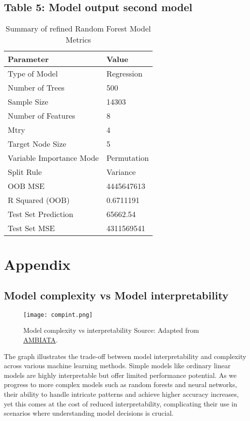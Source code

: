 \documentclass[12pt]{article}
\begin{document}
\subsection{Table 5: Model output second model}
\begin{table}[h]
	\centering
	\begin{tabular}{|l|l|}
		\hline
		\textbf{Parameter} & \textbf{Value} \\ \hline
		Type of Model & Regression \\ \hline
		Number of Trees & 500 \\ \hline
		Sample Size & 14303 \\ \hline
		Number of Features & 8 \\ \hline
		Mtry & 4 \\ \hline
		Target Node Size & 5 \\ \hline
		Variable Importance Mode & Permutation \\ \hline
		Split Rule & Variance \\ \hline
		OOB MSE & 4445647613\\ \hline
		R Squared (OOB) & 0.6711191 \\ \hline
		Test Set Prediction & 65662.54 \\ \hline
		Test Set MSE & 4311569541 \\ \hline
	\end{tabular}
	\caption{Summary of refined Random Forest Model Metrics}
	\label{tab:model_metrics2}
\end{table}

\newpage
\section{Appendix} %

\subsection{Model complexity vs Model interpretability}
\begin{figure}[htbp]
	\centering
	\texttt{[image: compint.png]}
	\caption{Model complexity vs interpretability Source: Adapted from \href{https://ambiata.com/blog/2021-04-12-xai-part-1/}{AMBIATA}.}
	\label{fig:compin}
\end{figure}
The graph illustrates the trade-off between model interpretability and complexity across various machine learning methods. Simple models like ordinary linear models are highly interpretable but offer limited performance potential. As we progress to more complex models such as random forests and neural networks, their ability to handle intricate patterns and achieve higher accuracy increases, yet this comes at the cost of reduced interpretability, complicating their use in scenarios where understanding model decisions is crucial.
\end{document}
